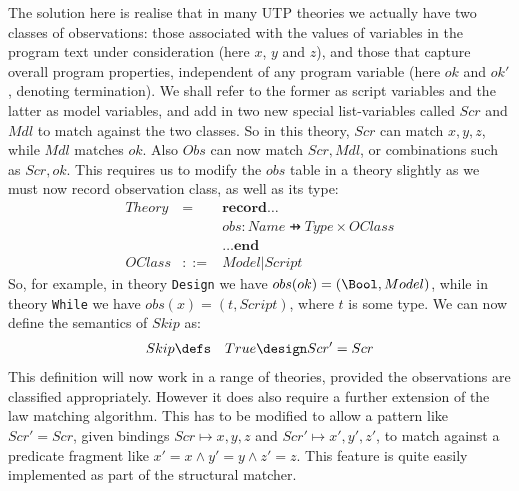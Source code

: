 The solution here is realise that in many UTP theories
we actually have two classes of observations: those associated with
the values of variables in the program text under consideration (here $x$, $y$ and $z$),
and those that capture overall program properties, independent of any program variable
(here $ok$ and $ok'$, denoting termination).
We shall refer to the former as script variables and the latter as model variables,
and add in two new special list-variables called $Scr$ and $Mdl$
to match against the two classes.
So in this theory, $Scr$ can match $x,y,z$, while $Mdl$ matches $ok$.
Also $Obs$ can now match $Scr,Mdl$, or combinations such as $Scr,ok$.
This requires us to modify the $obs$ table in a theory slightly
as we must now record observation class, as well as its type:
\begin{eqnarray*}
Theory &=& \textbf{record} \ldots
\\ && obs : Name \pfun Type \times OClass
\\ && \ldots \textbf{end}
\\ OClass &::=& Model | Script
\end{eqnarray*}
So, for example, in theory \texttt{Design} we have $obs(ok) = (\Bool,Model)$,
while in theory \texttt{While} we have $obs(x) = (t,Script)$, where $t$ is some type.
We can now define the semantics of $Skip$ as:
\begin{eqnarray*}
  Skip &\defs& True \design Scr'=Scr
\end{eqnarray*}
This definition will now work in a range of theories,
provided the observations are classified appropriately.
However it does also require a further extension
of the law matching algorithm.
This has to be modified to allow a pattern like $Scr'=Scr$,
given bindings $Scr \mapsto x,y,z$ and $Scr' \mapsto x',y',z'$,
to match against a predicate fragment like $x'=x \land y'=y \land z'=z$.
This feature is quite easily implemented as part of the structural matcher.

